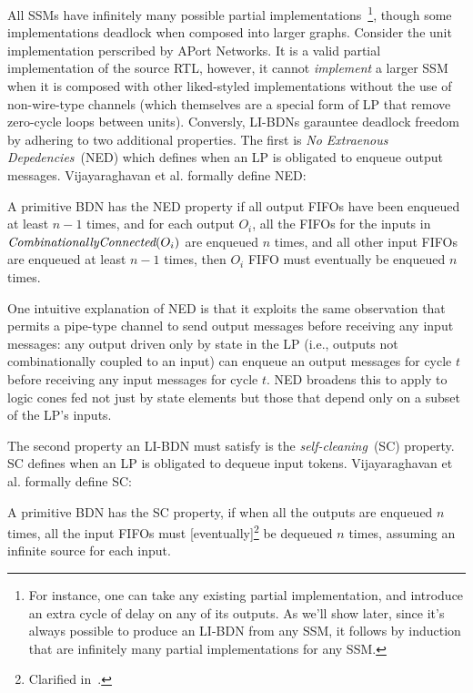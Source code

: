 All SSMs have infinitely many possible partial implementations~\footnote{For
instance, one can take any existing partial implementation, and introduce an
extra cycle of delay on any of its outputs. As we'll show later, since it's
always possible to produce an LI-BDN from any SSM, it follows by induction that are infinitely many partial implementations
for any SSM.}, though some implementations deadlock when composed into larger graphs.
Consider the unit implementation perscribed by APort Networks. It is a valid partial implementation of
the source RTL, however, it cannot \emph{implement} a larger SSM when it is composed 
with other liked-styled implementations without the use of non-wire-type channels (which themselves
are a special form of LP that remove zero-cycle loops between units).
Conversly, LI-BDNs garauntee deadlock freedom by adhering to two additional properties.
The first is \emph{No Extraenous Depedencies}~(NED) which defines when an LP is obligated to enqueue output messages. Vijayaraghavan et al.\cite{LIBDN} formally define NED:

\begin{widequote}
A primitive BDN has the NED property if all output FIFOs have been enqueued at least $n-1$ times,
and for each output $O_i$, all the FIFOs for the inputs in $\emph{CombinationallyConnected}(O_i)$
are enqueued $n$ times, and all other input FIFOs are enqueued at least $n-1$ times, then $O_i$ FIFO
must eventually be enqueued $n$ times.
\end{widequote}\label{def:ned}

One intuitive explanation of NED is that it exploits the same observation that
permits a pipe-type channel to send output messages before receiving any input
messages: any output driven only by state in the LP (i.e., outputs not
combinationally coupled to an input) can enqueue an output messages for cycle
$t$ before receiving any input messages for cycle $t$. NED broadens this to apply to logic cones fed not just by state
elements but those that depend only on a subset of the LP's inputs.

The second property an LI-BDN must satisfy is the \emph{self-cleaning}~(SC) property. SC 
defines when an LP is obligated to dequeue input tokens. Vijayaraghavan et al.\cite{LIBDN} formally define SC:

\begin{widequote}
A primitive BDN has the SC property, if when all the
outputs are enqueued $n$ times, all the input FIFOs must
[eventually]\footnote{Clarified in~\cite{LIBDNMasters}.} be dequeued $n$ times, assuming an infinite source for each
input.
\end{widequote}\label{def:sc}

